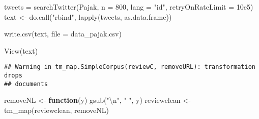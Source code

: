 \documentclass[
]{article}
\newenvironment{Shaded}{\begin{snugshade}}{\end{snugshade}}
\newcommand{\AttributeTok}[1]{\textcolor[rgb]{0.77,0.63,0.00}{#1}}
\newcommand{\ControlFlowTok}[1]{\textcolor[rgb]{0.13,0.29,0.53}{\textbf{#1}}}
\newcommand{\DecValTok}[1]{\textcolor[rgb]{0.00,0.00,0.81}{#1}}
\newcommand{\FloatTok}[1]{\textcolor[rgb]{0.00,0.00,0.81}{#1}}
\newcommand{\FunctionTok}[1]{\textcolor[rgb]{0.00,0.00,0.00}{#1}}
\newcommand{\NormalTok}[1]{#1}
\newcommand{\OtherTok}[1]{\textcolor[rgb]{0.56,0.35,0.01}{#1}}
\newcommand{\SpecialCharTok}[1]{\textcolor[rgb]{0.00,0.00,0.00}{#1}}
\newcommand{\StringTok}[1]{\textcolor[rgb]{0.31,0.60,0.02}{#1}}
\begin{document}
\begin{Shaded}
\begin{Highlighting}[]
\NormalTok{tweets }\OtherTok{=} \FunctionTok{searchTwitter}\NormalTok{(}\StringTok{\textquotesingle{}Pajak\textquotesingle{}}\NormalTok{, }
                               \AttributeTok{n =} \DecValTok{800}\NormalTok{,}
                               \AttributeTok{lang =} \StringTok{"id"}\NormalTok{,}
                               \AttributeTok{retryOnRateLimit =} \FloatTok{10e5}\NormalTok{)}
\NormalTok{text }\OtherTok{\textless{}{-}} \FunctionTok{do.call}\NormalTok{(}\StringTok{"rbind"}\NormalTok{, }\FunctionTok{lapply}\NormalTok{(tweets, as.data.frame))}

\FunctionTok{write.csv}\NormalTok{(text, }\AttributeTok{file =} \StringTok{\textquotesingle{}data\_pajak.csv\textquotesingle{}}\NormalTok{)}
\end{Highlighting}
\end{Shaded}

\begin{Shaded}
\begin{Highlighting}[]
\FunctionTok{View}\NormalTok{(text)}
\end{Highlighting}
\end{Shaded}

\begin{Shaded}
\end{Shaded}

\begin{verbatim}
## Warning in tm_map.SimpleCorpus(reviewC, removeURL): transformation drops
## documents
\end{verbatim}

\begin{Shaded}
\begin{Highlighting}[]
\NormalTok{removeNL }\OtherTok{\textless{}{-}} \ControlFlowTok{function}\NormalTok{(y) }\FunctionTok{gsub}\NormalTok{(}\StringTok{"}\SpecialCharTok{\textbackslash{}n}\StringTok{"}\NormalTok{, }\StringTok{" "}\NormalTok{, y)}
\NormalTok{reviewclean }\OtherTok{\textless{}{-}} \FunctionTok{tm\_map}\NormalTok{(reviewclean, removeNL)}
\end{Highlighting}
\end{Shaded}
\end{document}
